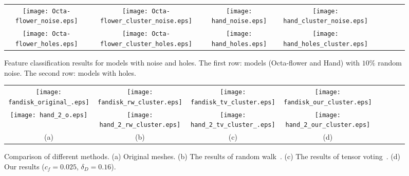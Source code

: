 \documentclass[10pt,journal,cspaper,compsoc]{IEEEtran}
\begin{document}
\begin{figure*}
\begin{center}
\begin{tabular}{@{}c@{} @{}c@{} @{}c@{} @{}c@{} @{}c@{} @{}c@{} @{}c@{} @{}c@{} }
\texttt{[image: Octa-flower\_noise.eps]}&
\texttt{[image: Octa-flower\_cluster\_noise.eps]}&
\texttt{[image: hand\_noise.eps]}&
\texttt{[image: hand\_cluster\_noise.eps]}\\
\texttt{[image: Octa-flower\_holes.eps]} &
\texttt{[image: Octa-flower\_cluster\_holes.eps]}&
\texttt{[image: hand\_holes.eps]} &
\texttt{[image: hand\_holes\_cluster.eps]}\\
\end{tabular}
\caption{Feature classification results for models with noise and holes.
The first row: models (Octa-flower and Hand) with $10\%$ random noise.
The second row: models with holes.}
\label{fig:noise}
\end{center}
\end{figure*}

\begin{figure*}
\begin{center}
\begin{tabular}{@{}c@{} @{}c@{} @{}c@{} @{}c@{} @{}c@{} @{}c@{} @{}c@{} @{}c@{}}
\texttt{[image: fandisk\_original\_.eps]} &
\texttt{[image: fandisk\_rw\_cluster.eps]} &
\texttt{[image: fandisk\_tv\_cluster.eps]} &
\texttt{[image: fandisk\_our\_cluster.eps]}\\
\texttt{[image: hand\_2\_o.eps]} &
\texttt{[image: hand\_2\_rw\_cluster.eps]} &
\texttt{[image: hand\_2\_tv\_cluster\_.eps]} &
\texttt{[image: hand\_2\_our\_cluster.eps]}\\
(a)& (b)  &(c)  & (d) \\
\end{tabular}
\caption{Comparison of different methods.
(a) Original meshes. (b) The results of random walk~\cite{LHMR09}. (c)
The results of tensor voting~\cite{KCL09}. (d) Our results
($c_f=0.025$, $\delta_D=0.16$).}
\label{fig:comparison}
\end{center}
\end{figure*}
\end{document}
